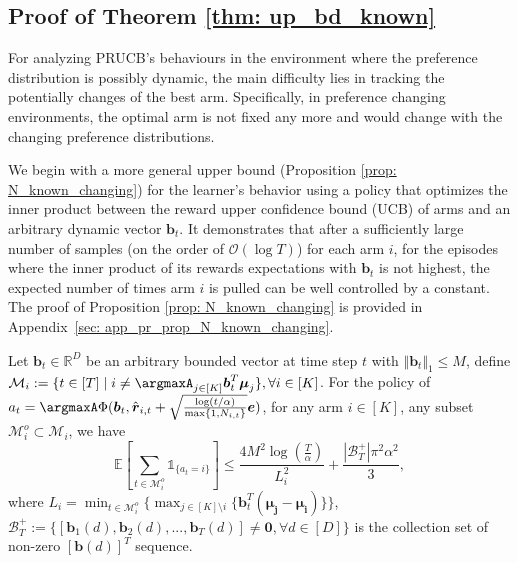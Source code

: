 





\subsection{Proof of Theorem \ref{thm: up_bd_known}}
\label{sec:app_pf_known_change}

For analyzing PRUCB's behaviours in the environment where the preference distribution is possibly dynamic, the main difficulty lies in tracking the potentially changes of the best arm.
Specifically, in preference changing environments, the optimal arm is not fixed any more and would change with the changing preference distributions. 

We begin with a more general upper bound (Proposition \ref{prop: N_known_changing}) for the learner's behavior using a policy that optimizes the inner product between the reward upper confidence bound (UCB) of arms and an arbitrary dynamic vector $\boldsymbol{b}_t$. It demonstrates that after a sufficiently large number of samples (on the order of $\mathcal{O}(\log T)$) for each arm $i$, for the episodes where the inner product of its rewards expectations with $\boldsymbol{b}_t$ is not highest, the expected number of times arm $i$ is pulled can be well controlled by a constant.
The proof of Proposition \ref{prop: N_known_changing} is provided in Appendix~\ref{sec: app_pr_prop_N_known_changing}.



\begin{proposition}
\label{prop: N_known_changing}
Let $\boldsymbol{b}_t \in \mathbb{R}^D$ be an arbitrary bounded vector at time step $t$ with $\Vert \boldsymbol{b}_t \Vert_1 \leq M$, define $\mathcal{M}_i := \{ t \in [T] \mid i \neq \argmaxA_{j \in [K]} \boldsymbol{b}_t^T \boldsymbol{\mu}_j \}, \forall i \in [K]$. For the policy of $a_t = \argmaxA \Phi ( \boldsymbol{b}_t, \hat{\boldsymbol{r}}_{i,t}+\sqrt{\frac{\log(t/\alpha)}{\max \{1, N_{i, t } \} }} \boldsymbol{e})$, for any arm $i \in [K]$, any subset $\mathcal{M}^{o}_i \subset \mathcal{M}_i$, we have
\[
\mathbb{E} \left[ \sum_{t \in \mathcal{M}^{o}_i} \mathds{1}_{\{a_t = i \} } \right] 
\leq
\frac{4 M^2 \log{(\frac{T}{\alpha})}}{L_i^2}
+
\frac{ |\mathcal{B}^{+}_{T}| \pi^2 \alpha^2} {3},
\]
where $L_i = \min_{t \in \mathcal{M}^{o}_i} \{ \max_{j \in [K] \setminus i } \{\boldsymbol{b}_t^T (\boldsymbol{\boldsymbol{\mu}_j - \boldsymbol{\mu}_{i}
} )\} \}$, $\mathcal{B}^{+}_{T} := \{{[\boldsymbol{b}_{1}(d), \boldsymbol{b}_{2}(d), ..., \boldsymbol{b}_{T}(d)]} \neq \boldsymbol{0}, \forall d \in [D]\}$ is the collection set of non-zero $[\boldsymbol{b}(d)]^T$ sequence. 
\end{proposition}

